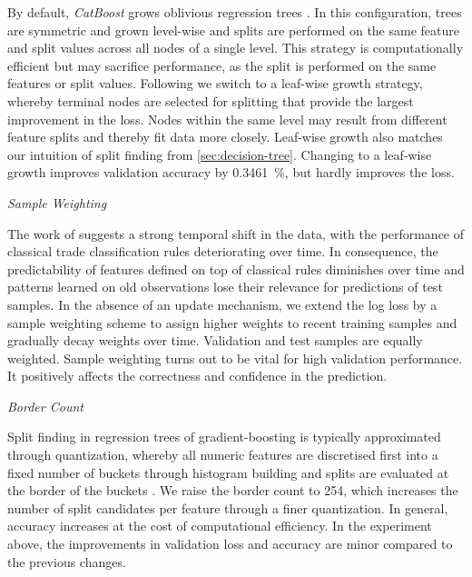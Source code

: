 By default, \emph{CatBoost} grows oblivious regression trees \autocite[][4]{dorogushCatBoostGradientBoosting}. In this configuration, trees are symmetric and grown level-wise and splits are performed on the same feature and split values across all nodes of a single level. This strategy is computationally efficient but may sacrifice performance, as the split is performed on the same features or split values. Following \textcite[][4]{chenXGBoostScalableTree2016} we switch to a leaf-wise growth strategy, whereby terminal nodes are selected for splitting that provide the largest improvement in the loss. Nodes within the same level may result from different feature splits and thereby fit data more closely. Leaf-wise growth also matches our intuition of split finding from \cref{sec:decision-tree}. Changing to a leaf-wise growth improves validation accuracy by \SI{0.3461}{\percent}, but hardly improves the loss.

\emph{Sample Weighting}

The work of \textcite[][36--38]{grauerOptionTradeClassification2022} suggests a strong temporal shift in the data, with the performance of classical trade classification rules deteriorating over time. In consequence, the predictability of features defined on top of classical rules diminishes over time and patterns learned on old observations lose their relevance for predictions of test samples. In the absence of an update mechanism, we extend the log loss by a sample weighting scheme to assign higher weights to recent training samples and gradually decay weights over time. Validation and test samples are equally weighted. Sample weighting turns out to be vital for high validation performance. It positively affects the correctness and confidence in the prediction.


\emph{Border Count}

Split finding in regression trees of gradient-boosting is typically approximated through quantization, whereby all numeric features are discretised first into a fixed number of buckets through histogram building and splits are evaluated at the border of the buckets \autocites[][4]{dorogushCatBoostGradientBoosting}[][2]{keLightGBMHighlyEfficient2017}. We raise the border count to \num{254}, which increases the number of split candidates per feature through a finer quantization. In general, accuracy increases at the cost of computational efficiency. In the experiment above, the improvements in validation loss and accuracy are minor compared to the previous changes.

